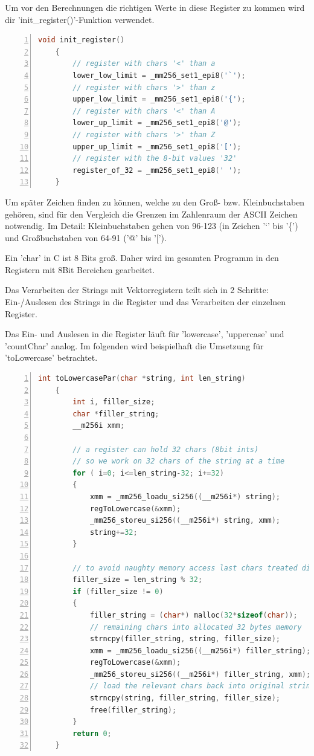 \documentclass[plainarticle,zihtitle,german,final,hyperref,utf8]{zihpub}
\begin{document}
Um vor den Berechnungen die richtigen Werte in diese Register zu kommen wird dir 'init\_register()'-Funktion verwendet.

\begin{lstlisting}[language=c, numbers=left]
	void init_register()
	{
		// register with chars '<' than a
		lower_low_limit = _mm256_set1_epi8('`');
		// register with chars '>' than z
		upper_low_limit = _mm256_set1_epi8('{');
		// register with chars '<' than A
		lower_up_limit = _mm256_set1_epi8('@');
		// register with chars '>' than Z
		upper_up_limit = _mm256_set1_epi8('[');
		// register with the 8-bit values '32'
		register_of_32 = _mm256_set1_epi8(' ');
	}
\end{lstlisting}

Um später Zeichen finden zu können, welche zu den Groß- bzw. Kleinbuchstaben gehören, sind für den Vergleich die Grenzen im Zahlenraum der ASCII Zeichen notwendig. Im Detail: Kleinbuchstaben gehen von 96-123 (in Zeichen '`' bis '\{') und Großbuchstaben von 64-91 ('@' bis '{[}').

Ein 'char' in C ist 8 Bits groß. Daher wird im gesamten Programm in den Registern mit 8Bit Bereichen gearbeitet.

Das Verarbeiten der Strings mit Vektorregistern teilt sich in 2 Schritte: Ein-/Auslesen des Strings in die Register und das Verarbeiten der einzelnen Register.

Das Ein- und Auslesen in die Register läuft für 'lowercase', 'uppercase' und 'countChar' analog. Im folgenden wird beispielhaft die Umsetzung für 'toLowercase' betrachtet.

\begin{lstlisting}[language=c, numbers=left]
	int toLowercasePar(char *string, int len_string)
	{
		int i, filler_size;
		char *filler_string;
		__m256i xmm;
		
		// a register can hold 32 chars (8bit ints)
		// so we work on 32 chars of the string at a time
		for ( i=0; i<=len_string-32; i+=32)
		{
			xmm = _mm256_loadu_si256((__m256i*) string);
			regToLowercase(&xmm);
			_mm256_storeu_si256((__m256i*) string, xmm);
			string+=32;
		}
		
		// to avoid naughty memory access last chars treated different
		filler_size = len_string % 32;
		if (filler_size != 0)
		{
			filler_string = (char*) malloc(32*sizeof(char));
			// remaining chars into allocated 32 bytes memory
			strncpy(filler_string, string, filler_size);
			xmm = _mm256_loadu_si256((__m256i*) filler_string);
			regToLowercase(&xmm);
			_mm256_storeu_si256((__m256i*) filler_string, xmm);	
			// load the relevant chars back into original string
			strncpy(string, filler_string, filler_size);
			free(filler_string);
		}
		return 0;
	}
\end{lstlisting}
\end{document}
